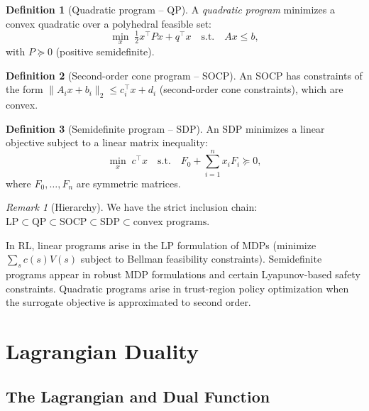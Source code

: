 \documentclass[11pt,a4paper]{article}
\theoremstyle{definition}
\newtheorem{definition}{Definition}[section]
\theoremstyle{plain}
\theoremstyle{remark}
\newtheorem{remark}{Remark}[section]
\begin{document}
\begin{definition}[Quadratic program -- QP]\label{def:qp}
A \emph{quadratic program} minimizes a convex quadratic over a polyhedral
feasible set:
\[
  \min_{x} \; \tfrac{1}{2} x^\top P x + q^\top x \quad \text{s.t.} \quad Ax \le b,
\]
with $P \succeq 0$ (positive semidefinite).
\end{definition}

\begin{definition}[Second-order cone program -- SOCP]\label{def:socp}
An SOCP has constraints of the form $\|A_i x + b_i\|_2 \le c_i^\top x + d_i$
(second-order cone constraints), which are convex.
\end{definition}

\begin{definition}[Semidefinite program -- SDP]\label{def:sdp}
An SDP minimizes a linear objective subject to a linear matrix inequality:
\[
  \min_{x} \; c^\top x \quad \text{s.t.} \quad F_0 + \sum_{i=1}^n x_i F_i \succeq 0,
\]
where $F_0, \dots, F_n$ are symmetric matrices.
\end{definition}

\begin{remark}[Hierarchy]\label{rem:hierarchy}
We have the strict inclusion chain:
$\text{LP} \subset \text{QP} \subset \text{SOCP} \subset \text{SDP} \subset
\text{convex programs}$.
\end{remark}

\begin{rlconnection}
In RL, linear programs arise in the LP formulation of MDPs (minimize
$\sum_s c(s) V(s)$ subject to Bellman feasibility constraints). Semidefinite
programs appear in robust MDP formulations and certain Lyapunov-based safety
constraints. Quadratic programs arise in trust-region policy optimization when
the surrogate objective is approximated to second order.
\end{rlconnection}

\section{Lagrangian Duality}\label{sec:duality}

\subsection{The Lagrangian and Dual Function}
\end{document}
